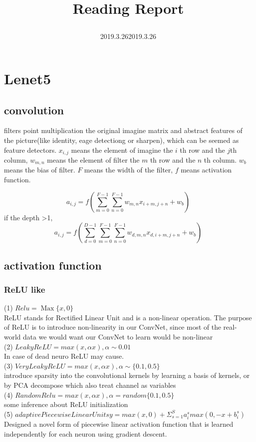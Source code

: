 \documentclass[12pt]{article}
\begin{document}
\title{Reading Report\date{2019.3.26}\date{2019.3.26}}
\maketitle
\setlength{\parindent}{0pt}
\renewcommand{\baselinestretch}{1.25}
\section{Lenet5}
\subsection{convolution}
filters point multiplication the original imagine matrix and abstract  features of the picture(like identity, eage detectiong or sharpen), which can be seemed as feature detectors.
$ x_{i,j} $ means the element of imagine the $ i $ th row and the $ j $th column, $ w_{m,n} $ means the element of filter the $ m $ th row and the $ n $ th column.  $ w_b $ means the bias of filter. $ F $ means the width of the filter, $ f $ means activation function.


$$ a_{i,j} = f(\sum_{m=0}^{F-1}  \sum_{n=0}^{F-1}  w_{m,n} x_{i+m, j+n} + w_b ) $$
if the depth >1,
$$ a_{i,j} = f(\sum_{d=0}^{D-1} \sum_{m=0}^{F-1} \sum_{n=0}^{F-1} w_{d,m,n} x_{d,i+m,j+n} + w_b) $$
\subsection{activation function}
\subsubsection*{ReLU like}
(1) $Relu=\mathop{Max}\{{x,0}\}$\\
ReLU stands for Rectified Linear Unit and is a non-linear operation. The purpose of ReLU is to introduce non-linearity in our ConvNet, since most of the real-world data we would want our ConvNet to learn would be non-linear\\
(2) $LeakyReLU=max(x,\alpha x), \alpha\sim0.01$\\
In case of dead neuro ReLU may cause.\\
(3) $Very Leaky ReLU=max(x,\alpha x), \alpha\sim\{{0.1,0.5}\}$\\
introduce sparsity into the convolutional kernels by learning a basis of kernels, or by PCA decompose which also treat channel as variables\\
(4) $Random Relu=max(x,\alpha x), \alpha=random\{{0.1,0.5}\}$\\
some inference about ReLU initialization\\
(5) $adaptive Piecewise Linear Units y=max(x,0)+\Sigma^{S}_{s=1}{a_i^s}max(0,-x+b_i^s)$\\
Designed a novel form of piecewise linear activation function that is learned independently for each neuron using gradient descent.\\
\end{document}
